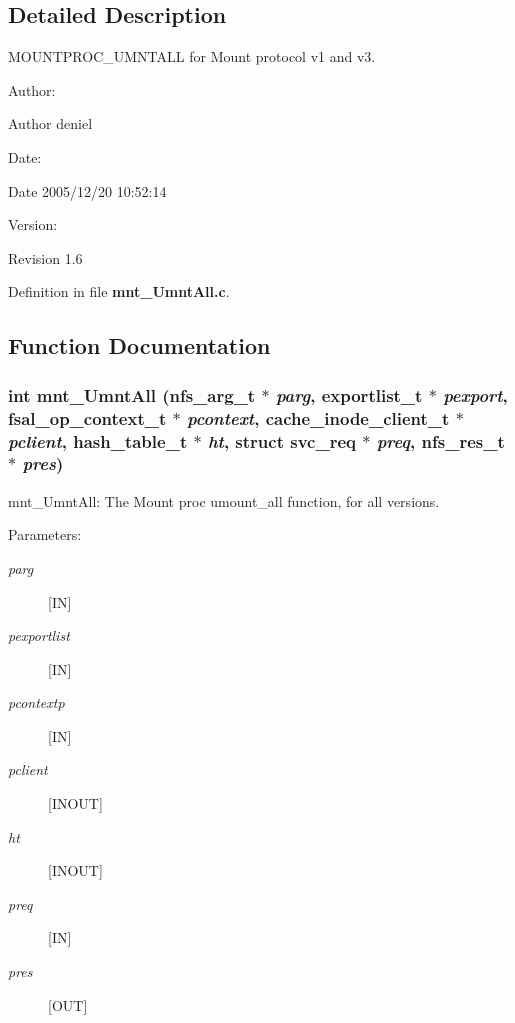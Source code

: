\subsection{Detailed Description}
MOUNTPROC\_\-UMNTALL for Mount protocol v1 and v3. 

\begin{Desc}
\item[Author:]\begin{Desc}
\item[Author]deniel \end{Desc}
\end{Desc}
\begin{Desc}
\item[Date:]\begin{Desc}
\item[Date]2005/12/20 10:52:14 \end{Desc}
\end{Desc}
\begin{Desc}
\item[Version:]\begin{Desc}
\item[Revision]1.6 \end{Desc}
\end{Desc}


Definition in file {\bf mnt\_\-Umnt\-All.c}.

\subsection{Function Documentation}
\subsubsection{\setlength{\rightskip}{0pt plus 5cm}int mnt\_\-Umnt\-All (nfs\_\-arg\_\-t $\ast$ {\em parg}, exportlist\_\-t $\ast$ {\em pexport}, fsal\_\-op\_\-context\_\-t $\ast$ {\em pcontext}, cache\_\-inode\_\-client\_\-t $\ast$ {\em pclient}, hash\_\-table\_\-t $\ast$ {\em ht}, struct svc\_\-req $\ast$ {\em preq}, nfs\_\-res\_\-t $\ast$ {\em pres})}\label{mnt__UmntAll_8c_a0}


mnt\_\-Umnt\-All: The Mount proc umount\_\-all function, for all versions.

\begin{Desc}
\item[Parameters:]
\begin{description}
\item[{\em parg}][IN] \item[{\em pexportlist}][IN] \item[{\em pcontextp}][IN] \item[{\em pclient}][INOUT] \item[{\em ht}][INOUT] \item[{\em preq}][IN] \item[{\em pres}][OUT] \end{description}
\end{Desc}


